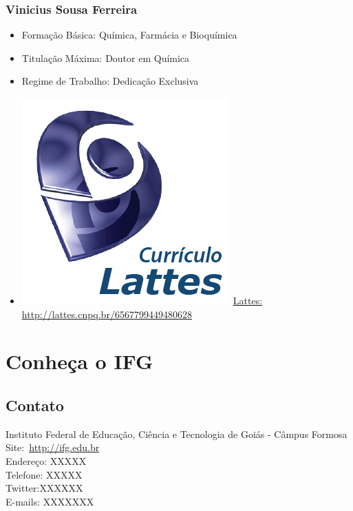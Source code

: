 \documentclass[11pt,fleqn]{book} %
\begin{document}
\subsection*{Vinicius Sousa Ferreira}\label{ViniciusFerreira}
\begin{itemize}
	\item Formação Básica: Química, Farmácia e Bioquímica
	\item Titulação Máxima: Doutor em Química
	\item Regime de Trabalho: Dedicação Exclusiva
	\item \includegraphics[scale=.03]{Pictures/lattes}~\href{http://lattes.cnpq.br/6567799449480628}{Lattes: http://lattes.cnpq.br/6567799449480628}
\end{itemize}


\chapter*{Conheça o IFG}
\vspace{6em}
\begin{flushright}
\end{flushright}
\vspace{12em}

\section{Contato}

Instituto Federal de Educação, Ciência e Tecnologia de Goiás - Câmpus Formosa\\
Site:~\url{http://ifg.edu.br}\\
Endereço: XXXXX\\
Telefone: XXXXX \\
Twitter:XXXXXX \\
E-mails: XXXXXXX
\end{document}

